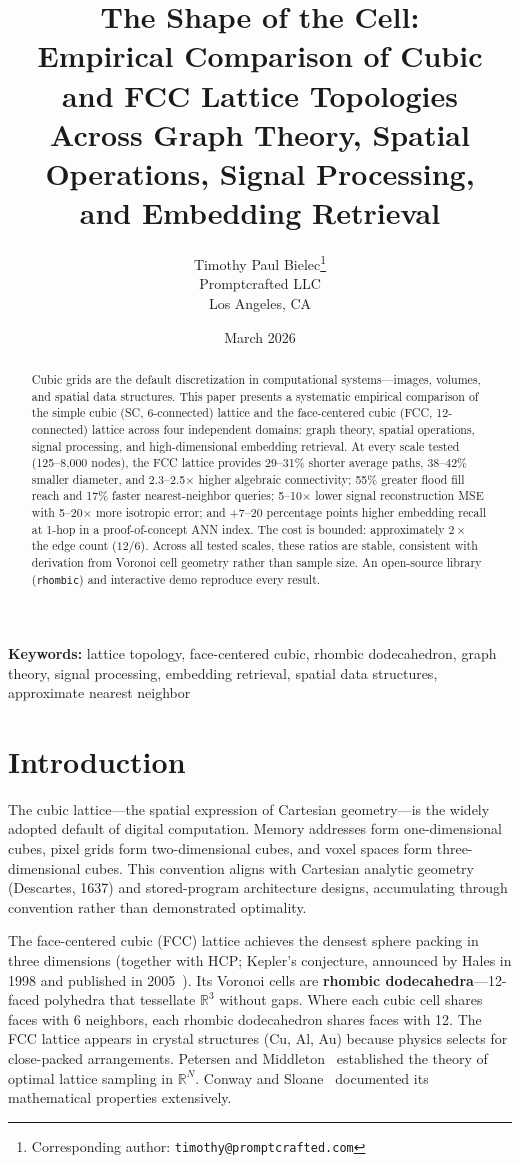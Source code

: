 \documentclass[11pt]{article}
\title{%
  The Shape of the Cell:\\
  Empirical Comparison of Cubic and FCC Lattice Topologies\\
  Across Graph Theory, Spatial Operations, Signal Processing,\\
  and Embedding Retrieval%
}
\author{%
  Timothy Paul Bielec\thanks{Corresponding author: \texttt{timothy@promptcrafted.com}}\\
  Promptcrafted LLC\\
  Los Angeles, CA
}
\date{March 2026}
\begin{document}
\maketitle

\begin{abstract}
Cubic grids are the default discretization in computational
systems---images, volumes, and spatial data structures. This paper
presents a systematic empirical comparison of the simple cubic
(SC, 6-connected) lattice and the face-centered cubic (FCC,
12-connected) lattice across four independent domains: graph theory,
spatial operations, signal processing, and high-dimensional embedding
retrieval. At every scale tested (125--8{,}000 nodes), the FCC lattice
provides 29--31\% shorter average paths, 38--42\% smaller diameter,
and 2.3--2.5$\times$ higher algebraic connectivity; 55\% greater
flood fill reach and 17\% faster nearest-neighbor queries; 5--10$\times$
lower signal reconstruction MSE with 5--20$\times$ more isotropic
error; and +7--20 percentage points higher embedding recall at 1-hop
in a proof-of-concept ANN index. The cost is bounded: approximately
$2\times$ the edge count ($12/6$). Across all tested scales, these ratios are stable,
consistent with derivation from Voronoi cell geometry rather than
sample size. An open-source library (\texttt{rhombic}) and interactive demo
reproduce every result.
\end{abstract}

\noindent\textbf{Keywords:} lattice topology, face-centered cubic,
rhombic dodecahedron, graph theory, signal processing, embedding
retrieval, spatial data structures, approximate nearest neighbor

\section{Introduction}
\label{sec:intro}

The cubic lattice---the spatial expression of Cartesian geometry---is
the widely adopted default of digital computation. Memory addresses form
one-dimensional cubes, pixel grids form two-dimensional cubes, and
voxel spaces form three-dimensional cubes. This convention aligns with Cartesian analytic geometry
(Descartes, 1637) and stored-program architecture designs, accumulating
through convention rather than demonstrated optimality.

The face-centered cubic (FCC) lattice achieves the densest sphere
packing in three dimensions (together with HCP; Kepler's conjecture, announced by Hales in 1998 and
published in 2005~\cite{hales2005}). Its Voronoi cells are \textbf{rhombic
dodecahedra}---12-faced polyhedra that tessellate $\mathbb{R}^3$
without gaps. Where each cubic cell shares faces with 6 neighbors,
each rhombic dodecahedron shares faces with 12. The FCC lattice
appears in crystal structures (Cu, Al, Au) because physics selects
for close-packed arrangements. Petersen and Middleton~\cite{petersen1962}
established the theory of optimal lattice sampling in
$\mathbb{R}^N$. Conway and
Sloane~\cite{conway1999} documented its mathematical properties
extensively.
\end{document}
